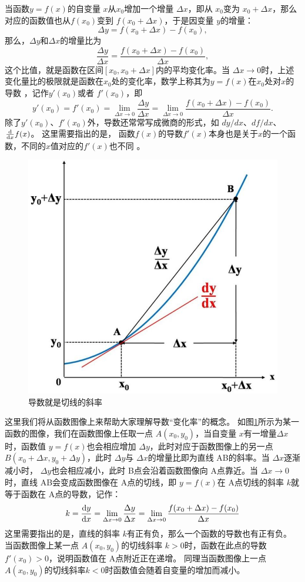  当函数$  y=f(x) $的自变量 $ x $从$  x_0 $增加一个增量 $ \Delta x $，即从 $ x_0 $变为 $ x_0+\Delta x $，那么对应的函数值也从$  f(x_0) $变到 $ f(x_0+\Delta x) $，于是因变量 $ y $的增量：
 \[
 \Delta y =  f(x_0+\Delta x) -f(x_0),
 \]
 那么，$ \Delta y $和$ \Delta x $的增量比为
 \[
 \frac{\Delta y}{\Delta x} = \frac{f(x_0+\Delta x) -f(x_0)}{\Delta x},
 \]
 这个比值，就是函数在区间$  [x_0,x_0+\Delta x] $内的平均变化率。当 $ \Delta x\rightarrow 0 $时，上述 变化量比的极限就是函数在$ x_0 $处的变化率，数学上称其为$ y=f(x) $在$ x_0 $处对$ x $的导数 ，记作$  y' (x_0) $或者 $ f' (x_0) $，即
 \begin{equation}
  y' (x_0) = f' (x_0) = \lim_{ \Delta x\rightarrow 0}\frac{\Delta y}{\Delta x} =  \lim_{ \Delta x\rightarrow 0}\frac{f(x_0+\Delta x) -f(x_0)}{\Delta x} .
 \end{equation}
 除了$  y' (x_0) $、$  f' (x_0) $外，导数还常常写成微商的形式，如 $ dy/dx $、$  df/dx $、 $ \dv{x} f(x) $。
 这里需要指出的是， 函数$ f(x) $的导数$ f' (x) $本身也是关于$ x $的一个函数，不同的$ x $值对应的$ f' (x) $也不同 。
  \begin{figure}
\centering
\includegraphics[width=0.5\linewidth]{image/kinamatics-6}
\caption{导数就是切线的斜率}
\label{fig:kinamatics-6}
\end{figure}


这里我们将从函数图像上来帮助大家理解导数“变化率”的概念。
如图\ref{fig:kinamatics-6}所示为某一函数的图像，我们在函数图像上任取一点 $ A(x_0,y_0) $，当自变量 $ x $有一增量$  \Delta x $时，函数值 $ y=f(x) $也会相应增加 $ \Delta y $，此时对应于函数图像上的另一点$  B(x_0+\Delta x,y_0+\Delta y) $，此时 $ \Delta y $与 $ \Delta x $的增量比即为直线 AB的斜率。当  $ \Delta x $逐渐减小时，  $ \Delta y $也会相应减小，此时 B点会沿着函数图像向 A点靠近。当  $ \Delta x \rightarrow 0 $时，直线 AB会变成函数图像在 A点的切线，即 $ y=f(x) $在 A点切线的斜率 $ k $就等于函数在 A点的导数，记作：
\begin{equation}
k = \dv{y}{x} = \lim_{ \Delta x\rightarrow 0}\frac{\Delta y}{\Delta x} =  \lim_{ \Delta x\rightarrow 0}\frac{f(x_0+\Delta x) -f(x_0)}{\Delta x}
\end{equation}
这里需要指出的是，直线的斜率 $ k $有正有负，那么一个函数的导数也有正有负。
当函数图像上某一点 $ A(x_0,y_0) $的切线斜率 $ k>0 $时，函数在此点的导数 $ f' (x_0)>0 $，说明函数值在 A点附近正在递增。
同理当函数图像上一点 $ A(x_0,y_0) $的切线斜率$ k<0 $时函数值会随着自变量的增加而减小。

